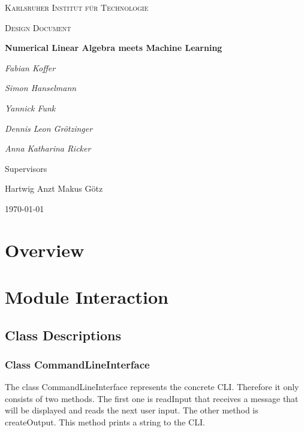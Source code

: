 \documentclass[parskip=full]{scrartcl}
\begin{document}
\begin{titlepage}
\centering
{\scshape\LARGE Karlsruher Institut für Technologie\par}
\vspace{1cm}
{\scshape\Large Design Document\par}
\vspace{1.5cm}
{\huge\bfseries Numerical Linear Algebra meets Machine Learning \par}
\vspace {2cm}

{\Large\itshape Fabian Koffer\par}
{\Large\itshape Simon Hanselmann\par}
{\Large\itshape Yannick Funk\par}
{\Large\itshape Dennis Leon Gr\"{o}tzinger\par}
{\Large\itshape Anna Katharina Ricker\par}

\vfill
Supervisors\par
Hartwig Anzt
Makus G\"{o}tz

\vfill
{\large\today\par}
\end{titlepage}

\tableofcontents
\newpage

\section{Overview}


\section{Module Interaction}

\subsection{Class Descriptions}

\subsubsection{Class CommandLineInterface}
The class CommandLineInterface represents the concrete \gls{CLI}.
Therefore it only consists of two methods. 
The first one is readInput that receives a message that will be displayed and reads the next user input.
The other method is createOutput.
This method prints a string to the \gls{CLI}.
\end{document}
